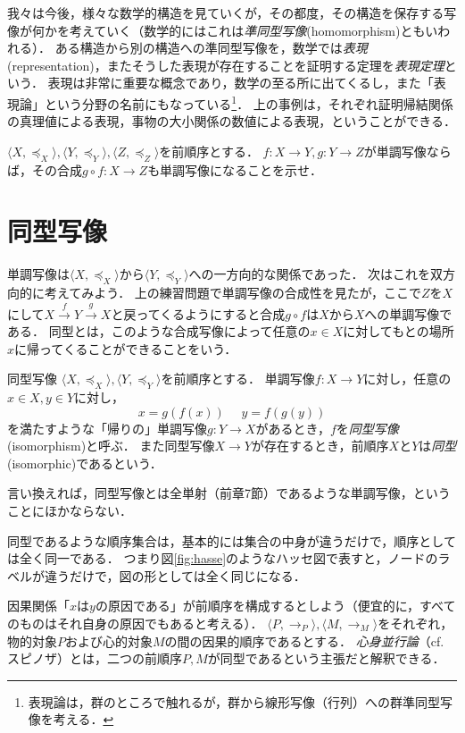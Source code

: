 \documentclass[dvipdfmx,11pt,a4paper]{jsarticle}
\begin{document}
我々は今後，様々な数学的構造を見ていくが，その都度，その構造を保存する写像が何かを考えていく（数学的にはこれは\emph{準同型写像}(homomorphism)ともいわれる）．
ある構造から別の構造への準同型写像を，数学では\emph{表現}(representation)，またそうした表現が存在することを証明する定理を\emph{表現定理}という．
表現は非常に重要な概念であり，数学の至る所に出てくるし，また「表現論」という分野の名前にもなっている\footnote{表現論は，群のところで触れるが，群から線形写像（行列）への群準同型写像を考える．}．
上の事例は，それぞれ証明帰結関係の真理値による表現，事物の大小関係の数値による表現，ということができる．


\begin{exercise}[単調写像の合成]
$\langle X, \preceq_X \rangle, \langle Y, \preceq_Y \rangle, \langle Z, \preceq_Z \rangle$を前順序とする．
$f:X \to Y, g:Y \to Z$が単調写像ならば，その合成$g \circ f: X \to Z$も単調写像になることを示せ． 
\end{exercise}


\section{同型写像}
単調写像は$\langle X, \preceq_X \rangle$から$\langle Y, \preceq_Y \rangle$への一方向的な関係であった．
次はこれを双方向的に考えてみよう．
上の練習問題で単調写像の合成性を見たが，ここで$Z$を$X$にして$X \xrightarrow{f} Y \xrightarrow{g} X$と戻ってくるようにすると合成$g \circ f$は$X$から$X$への単調写像である．
同型とは，このような合成写像によって任意の$x \in X$に対してもとの場所$x$に帰ってくることができることをいう．

\begin{itembox}[l]{同型写像}
$\langle X, \preceq_X \rangle, \langle Y, \preceq_Y \rangle$を前順序とする．
単調写像$f:X \to Y$に対し，任意の$x \in X, y \in Y$に対し，
\[
 x = g(f(x)) \ \ \ \ \ \ y = f(g(y))
\]
を満たすような「帰りの」単調写像$g:Y \to X$があるとき，$f$を\emph{同型写像}(isomorphism)と呼ぶ．
また同型写像$X \to Y$が存在するとき，前順序$X$と$Y$は\emph{同型}(isomorphic)であるという．
\end{itembox}
言い換えれば，同型写像とは全単射（前章7節）であるような単調写像，ということにほかならない．

同型であるような順序集合は，基本的には集合の中身が違うだけで，順序としては全く同一である．
つまり図\ref{fig:hasse}のようなハッセ図で表すと，ノードのラベルが違うだけで，図の形としては全く同じになる．


\begin{example}[心身並行論]
因果関係「$x$は$y$の原因である」が前順序を構成するとしよう（便宜的に，すべてのものはそれ自身の原因でもあると考える）．
$\langle P, \to_P \rangle, \langle M, \to_M \rangle$をそれぞれ，物的対象$P$および心的対象$M$の間の因果的順序であるとする．
\emph{心身並行論}（cf. スピノザ）とは，二つの前順序$P, M$が同型であるという主張だと解釈できる．
\end{example}
\end{document}
